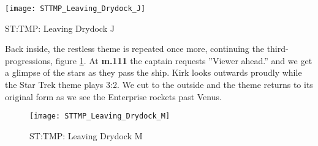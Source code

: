 \begin{marginfigure}
\center
\texttt{[image: STTMP\_Leaving\_Drydock\_J]}
	\caption{ST:TMP: Leaving Drydock J}
	\label{STTMP_Leaving_Drydock_J}
\end{marginfigure}


Back inside, the restless theme is repeated once more, continuing the third-progressions, figure \ref{STTMP_Leaving_Drydock_M}. At \textbf{m.111} the captain requests ''Viewer ahead.'' and we get a glimpse of the stars as they pass the ship. Kirk looks outwards proudly while the Star Trek theme plays 3:2. We cut to the outside and the theme returns to its original form as we see the Enterprise rockets past Venus.

\begin{figure}
\center
\texttt{[image: STTMP\_Leaving\_Drydock\_M]}
	\caption{ST:TMP: Leaving Drydock M}
	\label{STTMP_Leaving_Drydock_M}
\end{figure}


\clearpage


